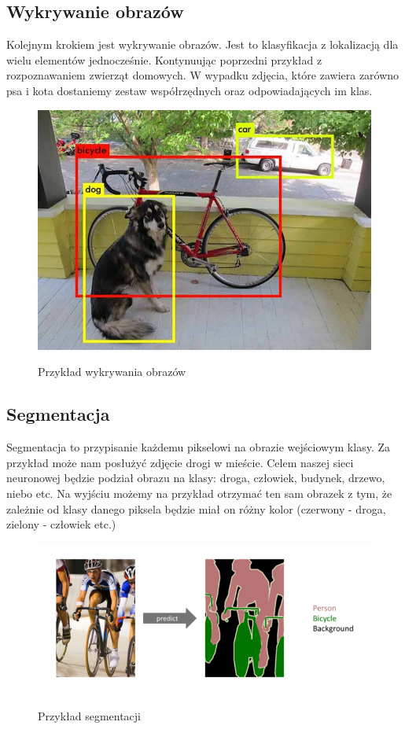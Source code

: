 \documentclass{article}
\begin{document}
\subsection{Wykrywanie obrazów}
Kolejnym krokiem jest wykrywanie obrazów. Jest to klasyfikacja z lokalizacją dla wielu elementów jednocześnie.
Kontynuując poprzedni przykład z rozpoznawaniem zwierząt domowych.
W wypadku zdjęcia, które zawiera zarówno psa i kota dostaniemy zestaw współrzędnych oraz odpowiadających im klas.
\begin{figure}[H]
    \centering
    \includegraphics[width=\linewidth]{images/detekcja.jpeg}
    \caption{Przykład wykrywania obrazów}
    \cite{unet}
    \label{fig:wykrywanie_obrazow}
\end{figure}
\subsection{Segmentacja}
Segmentacja to przypisanie każdemu pikselowi na obrazie wejściowym klasy.
Za przykład może nam posłużyć zdjęcie drogi w mieście.
Celem naszej sieci neuronowej będzie podział obrazu na klasy: droga, człowiek, budynek, drzewo, niebo etc.
Na wyjściu możemy na przykład otrzymać ten sam obrazek z tym, że zależnie od klasy danego piksela będzie miał on różny kolor (czerwony - droga, zielony - człowiek etc.)
\begin{figure}[H]
    \centering
    \includegraphics[width=\linewidth]{images/segmentacja.png}
    \caption{Przykład segmentacji}
    \cite{unet}
    \label{fig:segmentacja}
\end{figure}
\end{document}

